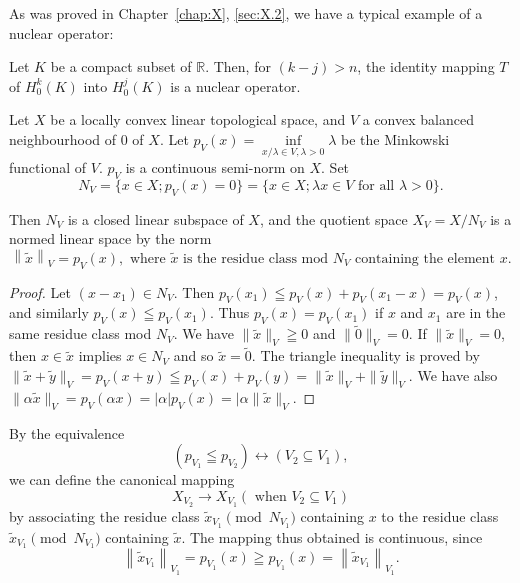 As was proved in Chapter~\ref{chap:X}, \ref{sec:X.2}, we have a typical example of a nuclear operator: 

\begin{examplen} Let $K$ be a compact subset of $\mathbb{R}$. Then, for $(k-j)>n$, the identity mapping $T$ of $H_{0}^{k}(K)$ into $H_{0}^{j}(K)$ is a nuclear operator.

\end{examplen}
\begin{proposition}\label{prop:AX.0.Proposition.2} Let $X$ be a locally convex linear topological space, and $V$ a convex balanced neighbourhood of $0$ of $X$. Let $p_{V}(x) = \inf\limits_{x/\lambda \in V, \lambda > 0} \lambda$ be the Minkowski functional of $V$. $p_{V}$ is a continuous semi-norm on $X$. Set 
\[
N _{V} = \{x \in X; p _{V} (x) = 0 \} = \{x \in X; \lambda x \in V \text{ for all } \lambda > 0 \}.
\]
\end{proposition}

Then $N_V$ is a closed linear subspace of $X$, and the quotient space $X_V = X / N_V$ is a normed linear space by the norm 
\begin{equation}\left\| \tilde {x} \right\| _{V} = p _{V} (x), \text{ where } \tilde {x} \text{ is the residue class mod } N _{V} \text{ containing the element } x. \label{eq:AX.0.2}\end{equation}

\begin{proof}
 Let $(x - x_1) \in N_V$. Then $p_V(x_1) \leqq p_V(x) + p_V(x_1 - x) = p_V(x)$, and similarly $p_V(x) \leqq p_V(x_1)$. Thus $p_V(x) = p_V(x_1)$ if $x$ and $x_1$ are in the same residue class mod $N_V$. We have $\|\tilde{x}\|_V \geqq 0$ and $\|\tilde{0}\|_V = 0$. If $\|\tilde{x}\|_V = 0$, then $x \in \tilde{x}$ implies $x \in N_V$ and so $\tilde{x} = \tilde{0}$. The triangle inequality is proved by $\|\tilde{x} + \tilde{y}\|_V = p_V(x + y) \leqq p_V(x) + p_V(y) = \|\tilde{x}\|_V + \|\tilde{y}\|_V$. We have also $\|\alpha \tilde{x}\|_V = p_V(\alpha x) = |\alpha | p_V(x) = |\alpha \|\tilde{x}\|_V$. 
\end{proof}

\begin{corollaryu} By the equivalence 
\begin{equation}\label{eq:AX.0.3}
\left(p _ {V _{1}} \leqq p _ {V _{2}}\right) \leftrightarrow \left(V _{2} \subseteq V _{1}\right),
\end{equation}
we can define the canonical mapping 
\[
X _ {V _{2}} \rightarrow X _ {V _{1}} (\text{ when } V _{2} \subseteq V _{1})
\]
by associating the residue class $\tilde{x}_{V_{1}}\pmod{N_{V_{1}}}$ containing $x$ to the residue class $\tilde{x}_{V_{1}}\pmod{N_{V_{1}}}$ containing $\tilde{x}$. The mapping thus obtained is continuous, since 
\[
\left\| \tilde {x} _ {V _{1}} \right\| _ {V _{1}} = p _ {V _{1}} (x) \geqq p _ {V _{1}} (x) = \left\| \tilde {x} _ {V _{1}} \right\| _ {V _{1}}.
\]
\end{corollaryu}

